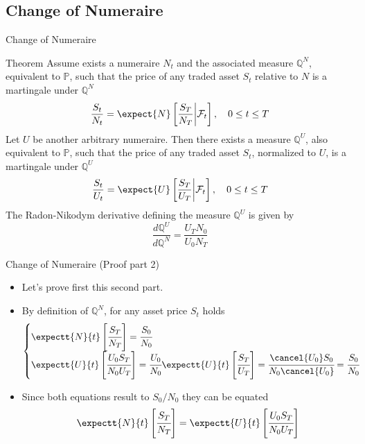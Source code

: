 \documentclass{beamer}
\begin{document}
\subsection{Change of Numeraire}
\begin{frame}{Change of Numeraire}
  \begin{block}{Theorem}
  	\small{
    Assume exists a numeraire $N_t$ and the associated measure $\mathbb{Q}^N$, equivalent to $\mathbb{P}$, such that the price of any traded asset $S_t$ relative to $N$ is a martingale under $\mathbb{Q}^N$
    \begin{equation*}
      \frac{S_t}{N_t} = \expect{N}\left[\frac{S_T}{N_T}\bigg|\mathcal{F}_t\right],\quad 0\le t \le T
    \end{equation*}
    Let $U$ be another arbitrary numeraire. Then there exists a measure $\mathbb{Q}^U$, also equivalent to $\mathbb{P}$, such that the price of any traded asset $S_t$, normalized to $U$, is a martingale under $\mathbb{Q}^U$
    \begin{equation*}
      \frac{S_t}{U_t} = \expect{U}\left[\frac{S_T}{U_T}\bigg|\mathcal{F}_t\right],\quad 0\le t \le T
    \end{equation*}
    The Radon-Nikodym derivative defining the measure $\mathbb{Q}^U$ is given by
\begin{equation}
	\frac{d\mathbb{Q}^U}{d\mathbb{Q}^N} = \frac{U_T N_0}{U_0 N_T}
	\label{eq:radon_nikodym_der2}
\end{equation}}
  \end{block}
\end{frame}	

\begin{frame}{Change of Numeraire (Proof part 2)}
	\begin{itemize}
		\item Let's prove first this second part.
  		\item By definition of $\mathbb{Q}^N$, for any asset price $S_t$ holds
	  \begin{equation*}
	    \begin{cases} 
	      \expectt{N}{t}\left[\cfrac{S_T}{N_T}\right] = \cfrac{S_0}{N_0} \\
\expectt{U}{t}\left[\cfrac{U_0 S_T}{N_0 U_T}\right] = \cfrac{U_0}{N_0}\expectt{U}{t}\left[\cfrac{S_T}{U_T}\right] = \cfrac{\cancel{U_0} S_0}{N_0 \cancel{U_0}} = \cfrac{S_0}{N_0}
	    \end{cases}
	  \end{equation*}
  	\item Since both equations result to $S_0/N_0$ they can be equated
  	\begin{equation*}
  	\expectt{N}{t}\left[\cfrac{S_T}{N_T}\right] = \expectt{U}{t}\left[\cfrac{U_0 S_T}{N_0 U_T}\right]
  	\end{equation*}
  	\end{itemize} 
\end{frame}
\end{document}
